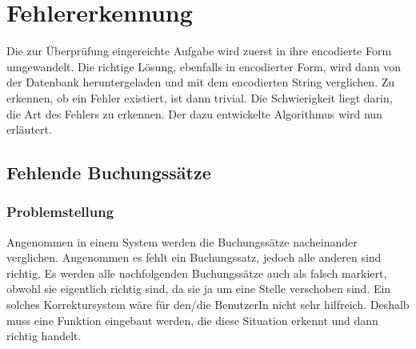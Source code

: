 \documentclass[12pt]{report}
\begin{document}
\section{Fehlererkennung}
Die zur Überprüfung eingereichte Aufgabe wird zuerst in ihre encodierte Form umgewandelt. Die richtige Lösung, ebenfalls in encodierter Form, wird dann von der Datenbank heruntergeladen und mit dem encodierten String verglichen. Zu erkennen, ob ein Fehler existiert, ist dann trivial. Die Schwierigkeit liegt darin, die Art des Fehlers zu erkennen. Der dazu entwickelte Algorithmus wird nun erläutert.

\subsection{Fehlende Buchungssätze}

\subsubsection{Problemstellung}
Angenommen in einem System werden die Buchungssätze nacheinander verglichen. Angenommen es fehlt ein Buchungssatz, jedoch alle anderen sind richtig. Es werden alle nachfolgenden Buchungssätze auch als falsch markiert, obwohl sie eigentlich richtig sind, da sie ja um eine Stelle verschoben sind. Ein solches Korrektursystem wäre für den/die BenutzerIn nicht sehr hilfreich. Deshalb muss eine Funktion eingebaut werden, die diese Situation erkennt und dann richtig handelt. 
\end{document}
